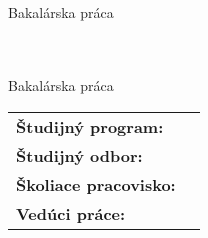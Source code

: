 \newcommand{\coverTop}{
    \begin{center}
        {\textbf \Large \textsc {\settingsSchool \\ \settingsFaculty}}
        \vfill
        {\LARGE \em \settingsTitle} \\ {\large Bakalárska práca}
    \end{center}
}

\newcommand{\coverCenter}{
    \begin{tabular}{l l}
        \textbf{Študijný program:} & \settingsProgramme \\
        \textbf{Študijný odbor:} & \settingsField \\
        \textbf{Školiace pracovisko:} & \settingsDepartment \\
        \textbf{Vedúci práce:} &  \settingsAdvisor
    \end{tabular}
}

\newcommand{\coverBottom}{
    \begin{center}
        \textbf{\settingsYear \hfill \settingsAuthor}
    \end{center}
}

\thispagestyle{empty}
\coverTop
\vfill
\coverBottom
\newpage

\thispagestyle{empty}
\coverTop
\vfill
\coverCenter
\vfill
\coverBottom
\newpage


